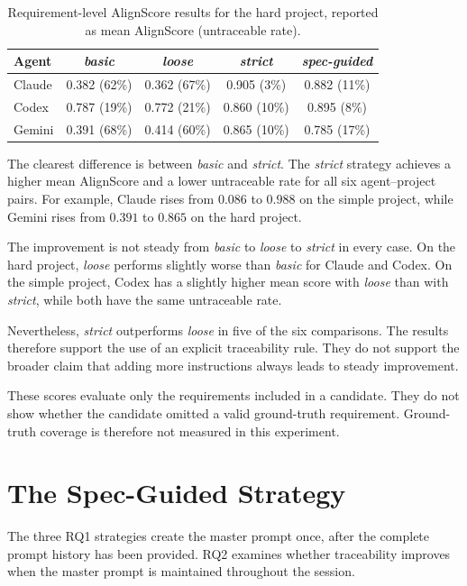 \begin{table}[htbp]
  \centering
  \caption{Requirement-level AlignScore results for the hard project, reported as mean AlignScore (untraceable rate).}
  \label{tab:results-hard}
  \begin{tabular}{@{}lcccc@{}}
    \toprule
    Agent & \emph{basic} & \emph{loose} & \emph{strict} & \emph{spec-guided} \\
    \midrule
    Claude & 0.382 (62\%) & 0.362 (67\%) & 0.905 (3\%) & 0.882 (11\%) \\
    Codex  & 0.787 (19\%) & 0.772 (21\%) & 0.860 (10\%) & 0.895 (8\%) \\
    Gemini & 0.391 (68\%) & 0.414 (60\%) & 0.865 (10\%) & 0.785 (17\%) \\
    \bottomrule
  \end{tabular}
\end{table}

The clearest difference is between \emph{basic} and \emph{strict}. The
\emph{strict} strategy achieves a higher mean AlignScore and a lower
untraceable rate for all six agent--project pairs. For example, Claude rises
from $0.086$ to $0.988$ on the simple project, while Gemini rises from
$0.391$ to $0.865$ on the hard project.

The improvement is not steady from \emph{basic} to \emph{loose} to
\emph{strict} in every case. On the hard project, \emph{loose} performs
slightly worse than \emph{basic} for Claude and Codex. On the simple project,
Codex has a slightly higher mean score with \emph{loose} than with
\emph{strict}, while both have the same untraceable rate.

Nevertheless, \emph{strict} outperforms \emph{loose} in five of the six
comparisons. The results therefore support the use of an explicit
traceability rule. They do not support the broader claim that adding more
instructions always leads to steady improvement.

These scores evaluate only the requirements included in a candidate. They do
not show whether the candidate omitted a valid ground-truth requirement.
Ground-truth coverage is therefore not measured in this experiment.

\section{The Spec-Guided Strategy}
\label{sec:rq2-design}

The three RQ1 strategies create the master prompt once, after the complete
prompt history has been provided. RQ2 examines whether traceability improves
when the master prompt is maintained throughout the session.

